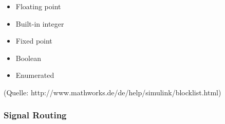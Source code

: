 \documentclass[fontsize = 12pt, paper = a4]{scrreprt}
\begin{document}
\begin{itemize}
\begin{itemize}

\item Floating point
\item Built-in integer
\item Fixed point
\item Boolean
\item Enumerated

\end{itemize}

(Quelle: http://www.mathworks.de/de/help/simulink/blocklist.html) 

\end{itemize}

\newpage


\subsubsection{Signal Routing}
\end{document}
